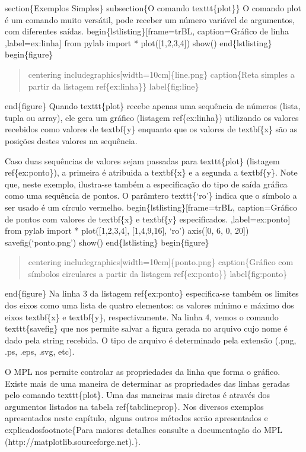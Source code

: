\documentclass[a4paper,10pt,portuguese]{sphinxmanual}
\begin{document}
section\{Exemplos Simples\}
subsection\{O comando texttt\{plot\}\}
O comando plot é um comando muito versátil, pode receber um número variável de argumentos, com diferentes saídas.
begin\{lstlisting\}{[}frame=trBL, caption=Gráfico de linha ,label=ex:linha{]}
from pylab import *
plot({[}1,2,3,4{]})
show()
end\{lstlisting\}
begin\{figure\}
\begin{quote}

centering
includegraphics{[}width=10cm{]}\{line.png\}
caption\{Reta simples a partir da listagem ref\{ex:linha\}\}
label\{fig:line\}
\end{quote}

end\{figure\}
Quando texttt\{plot\} recebe apenas uma sequência de números (lista, tupla ou array), ele gera um gráfico (listagem ref\{ex:linha\}) utilizando os valores recebidos como valores de textbf\{y\} enquanto que os valores de textbf\{x\} são as posições destes valores na sequência.

Caso duas sequências de valores sejam passadas para texttt\{plot\} (listagem ref\{ex:ponto\}), a primeira é atribuida a textbf\{x\} e a segunda a textbf\{y\}. Note que, neste exemplo, ilustra-se também a especificação do tipo de saída gráfica como uma sequência de pontos. O parâmtero texttt\{`ro'\} indica que o símbolo a ser usado é um círculo vermelho.
begin\{lstlisting\}{[}frame=trBL, caption=Gráfico de pontos com valores de textbf\{x\} e textbf\{y\} especificados. ,label=ex:ponto{]}
from pylab import *
plot({[}1,2,3,4{]}, {[}1,4,9,16{]}, `ro')
axis({[}0, 6, 0, 20{]})
savefig(`ponto.png')
show()
end\{lstlisting\}
begin\{figure\}
\begin{quote}

centering
includegraphics{[}width=10cm{]}\{ponto.png\}
caption\{Gráfico com símbolos circulares a partir da listagem ref\{ex:ponto\}\}
label\{fig:ponto\}
\end{quote}

end\{figure\}
Na linha 3 da listagem ref\{ex:ponto\} especifica-se também os limites dos eixos como uma lista de quatro elementos: os valores mínimo e máximo dos eixos textbf\{x\} e textbf\{y\}, respectivamente. Na linha 4, vemos o comando texttt\{savefig\} que nos permite salvar a figura gerada no arquivo cujo nome é dado pela string recebida. O tipo de arquivo é determinado pela extensão (.png, .ps, .eps, .svg, etc).

O MPL nos permite controlar as propriedades da linha que forma o gráfico. Existe mais de uma maneira de determinar as propriedades das linhas geradas pelo comando texttt\{plot\}. Uma das maneiras mais diretas é através dos argumentos listados na tabela ref\{tab:lineprop\}. Nos diversos exemplos apresentados neste capítulo, alguns outros métodos serão apresentados e explicadosfootnote\{Para maiores detalhes consulte a documentação do MPL (http://matplotlib.sourceforge.net).\}.
\end{document}
